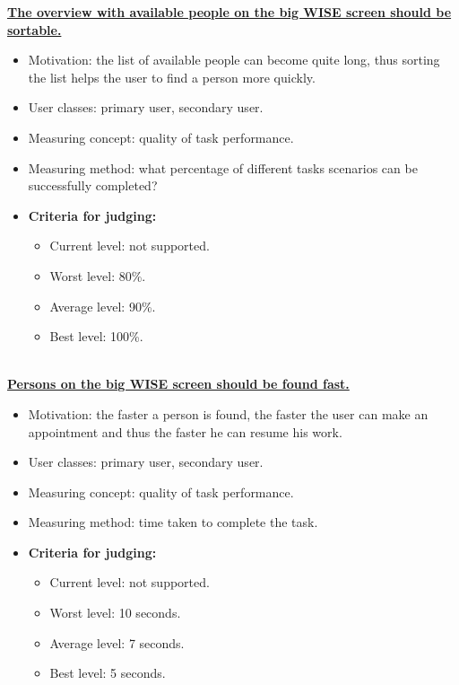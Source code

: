 \documentclass[11pt, a4paper,svglistings]{report}
\begin{document}
\textbf{\underline{The overview with available people on the big WISE screen should be sortable.}}
\begin{itemize}
\item{Motivation: the list of available people can become quite long, thus sorting the list helps the user to find a person more quickly.}
\item{User classes: primary user, secondary user.}
\item{Measuring concept: quality of task performance.}
\item{Measuring method:  what percentage of different tasks scenarios can be successfully completed?}
\item{\textbf{Criteria for judging:}}
\begin{itemize}
\item{Current level: not supported.}
\item{Worst level: 80\%.}
\item{Average level: 90\%.}
\item{Best level: 100\%. \\ \\}
\end{itemize}
\end{itemize}
\textbf{\underline{Persons on the big WISE screen should be found fast.}}
\begin{itemize}
\item{Motivation: the faster a person is found, the faster the user can make an appointment and thus the faster he can resume his work.}
\item{User classes: primary user, secondary user.}
\item{Measuring concept: quality of task performance.}
\item{Measuring method: time taken to complete the task.}
\item{\textbf{Criteria for judging:}}
\begin{itemize}
\item{Current level: not supported.}
\item{Worst level: 10 seconds.}
\item{Average level: 7 seconds.}
\item{Best level: 5 seconds. \\ \\}
\end{itemize}
\end{itemize}
\end{document}
